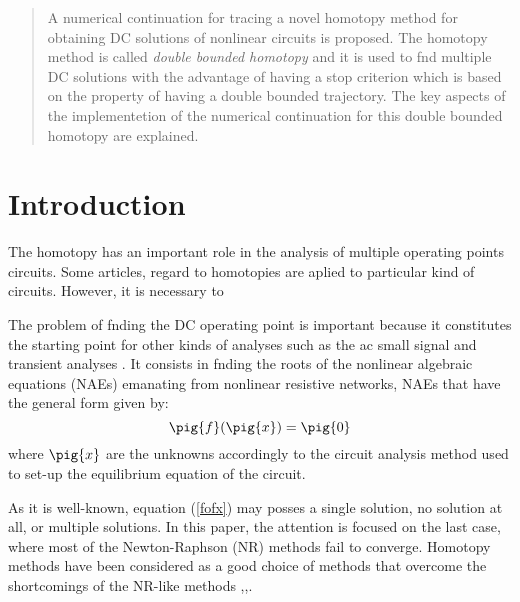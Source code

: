 \documentclass[conference]{IEEEtran}
\begin{document}

\maketitle



\begin{abstract}
A numerical continuation for tracing a novel homotopy method for obtaining  DC solutions of 
nonlinear circuits is proposed.
The homotopy method is called {\it double bounded homotopy} and it is used  to fnd multiple DC solutions 
with the advantage of having
a stop criterion  which is based on the property of having a double bounded trajectory. 
The key aspects of the implementetion of the numerical continuation
for this double bounded homotopy are explained.
\end{abstract}


\section{Introduction}



The homotopy has an important role in the analysis of multiple operating points circuits.
Some articles, regard to homotopies are aplied to particular kind of circuits. However, it
is necessary to  




The problem of fnding the DC operating point is important because
it constitutes the starting point for other kinds of analyses such as
the ac small signal and transient analyses \cite{homo_ogrodzki}.
It consists in fnding the roots of the nonlinear algebraic equations
(NAEs) emanating from nonlinear resistive networks, NAEs that have the
general form given by:
\begin{equation}
\pig{f}(\pig{x}) = \pig{0}
\label{fofx}
\end{equation}
where $\pig{x}$ are the unknowns accordingly to the circuit analysis method
used to set-up the equilibrium equation of the circuit.
\par
As it is well-known, equation (\ref{fofx}) may posses a single solution,
no solution at all, or multiple solutions.
In this paper, the attention is focused on the last case, where most
of the Newton-Raphson (NR) methods fail to converge. Homotopy methods
have been considered as a good choice of methods that overcome the
shortcomings of the NR-like methods
\cite{homo_ArtificialP},\cite{homo_DWolfMulti},\cite{cont_leu1}.
\end{document}

